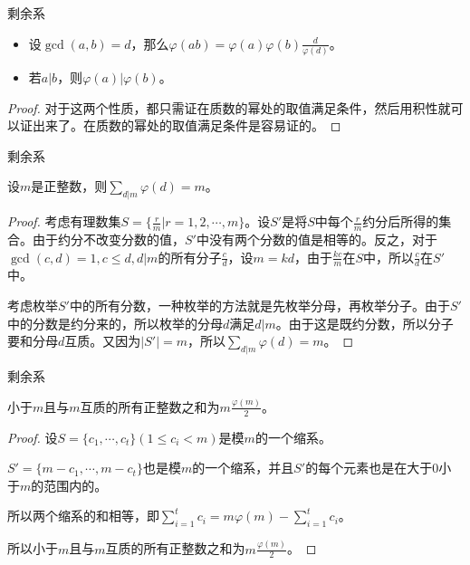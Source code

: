 \documentclass{ctexbeamer}        %
\begin{document}
\begin{frame}{剩余系}

\begin{theorem}[欧拉函数其他性质]
    \begin{itemize}
		\item 设$\gcd(a,b)=d$，那么$\varphi(ab)=\varphi(a)\varphi(b)\frac{d}{\varphi(d)}$。
		\item 若$a|b$，则$\varphi(a)|\varphi(b)$。
	\end{itemize}
\end{theorem}

\begin{proof}
	对于这两个性质，都只需证在质数的幂处的取值满足条件，然后用积性就可以证出来了。在质数的幂处的取值满足条件是容易证的。
\end{proof}

\end{frame}

\begin{frame}{剩余系}

\begin{theorem}[欧拉函数其他性质]
	设$m$是正整数，则$\sum_{d|m} \varphi(d) = m$。
\end{theorem}
\pause
\begin{proof}
	考虑有理数集$S=\lbrace \frac{r}{m} | r=1,2,\cdots,m \rbrace$。设$S'$是将$S$中每个$\frac{r}{m}$约分后所得的集合。由于约分不改变分数的值，$S'$中没有两个分数的值是相等的。反之，对于$\gcd(c,d)=1,c\le d,d|m$的所有分子$\frac{c}{d}$，设$m=kd$，由于$\frac{kc}{m}$在$S$中，所以$\frac{c}{d}$在$S'$中。

	考虑枚举$S'$中的所有分数，一种枚举的方法就是先枚举分母，再枚举分子。由于$S'$中的分数是约分来的，所以枚举的分母$d$满足$d|m$。由于这是既约分数，所以分子要和分母$d$互质。又因为$|S'|=m$，所以$\sum_{d|m} \varphi(d) = m$。
\end{proof}

\end{frame}

\begin{frame}{剩余系}

\begin{theorem}[欧拉函数其他性质]
	小于$m$且与$m$互质的所有正整数之和为$m\frac{\varphi(m)}{2}$。
\end{theorem}
\pause
\begin{proof}
	设$S=\lbrace c_1,\cdots,c_t \rbrace(1 \le c_i < m)$是模$m$的一个缩系。

	$S'=\lbrace m-c_1,\cdots,m-c_t \rbrace$也是模$m$的一个缩系，并且$S'$的每个元素也是在大于$0$小于$m$的范围内的。

	所以两个缩系的和相等，即$\sum_{i=1}^t c_i = m\varphi(m) - \sum_{i=1}^t c_i$。

	所以小于$m$且与$m$互质的所有正整数之和为$m\frac{\varphi(m)}{2}$。
\end{proof}

\end{frame}
\end{document}
